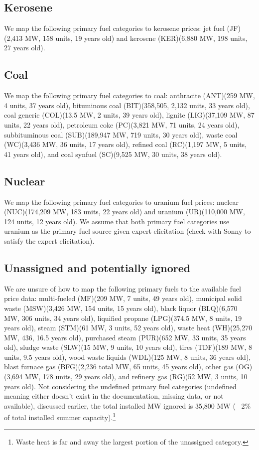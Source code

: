 \documentclass[10pt]{report}
\begin{document}
\subsection{Kerosene}
We map the following primary fuel categories to kerosene prices: jet fuel (JF)(2,413 MW, 158 units, 19 years old) and kerosene (KER)(6,880 MW, 198 units, 27 years old). 

\subsection{Coal}
We map the following primary fuel categories to coal: anthracite (ANT)(259 MW, 4 units, 37 years old), bituminous coal (BIT)(358,505, 2,132 units, 33 years old), coal generic (COL)(13.5 MW, 2 units, 39 years old), lignite (LIG)(37,109 MW, 87 units, 22 years old), petroleum coke (PC)(3,821 MW, 71 units, 24 years old), subbituminous coal (SUB)(189,947 MW, 719 units, 30 years old), waste coal (WC)(3,436 MW, 36 units, 17 years old), refined coal (RC)(1,197 MW, 5 units, 41 years old), and coal synfuel (SC)(9,525 MW, 30 units, 38 years old). 

\subsection{Nuclear}
We map the following primary fuel categories to uranium fuel prices: nuclear (NUC)(174,209 MW, 183 units, 22 years old) and uranium (UR)(110,000 MW, 124 units, 12 years old). 
We assume that both primary fuel categories use uranium as the primary fuel source given expert elicitation (check with Sonny to satisfy the expert elicitation).

\subsection{Unassigned and potentially ignored}
We are unsure of how to map the following primary fuels to the available fuel price data: multi-fueled (MF)(209 MW, 7 units, 49 years old), municipal solid waste (MSW)(3,426 MW, 154 units, 15 years old), black liquor (BLQ)(6,570 MW, 306 units, 34 years old), liquified propane (LPG)(374.5 MW, 8 units, 19 years old), steam (STM)(61 MW, 3 units, 52 years old), waste heat (WH)(25,270 MW, 436, 16.5 years old), purchased steam (PUR)(652 MW, 33 units, 35 years old), sludge waste (SLW)(15 MW, 9 units, 10 years old), tires (TDF)(189 MW, 8 units, 9.5 years old), wood waste liquids (WDL)(125 MW, 8 units, 36 years old), blast furnace gas (BFG)(2,236 total MW, 65 units, 45 years old), other gas (OG)(3,694 MW, 178 units, 29 years old), and refinery gas (RG)(52 MW, 3 units, 10 years old). 
Not considering the undefined primary fuel categories (undefined meaning either doesn't exist in the documentation, missing data, or not available), discussed earlier, the total installed MW ignored is 35,800 MW (~ 2\% of total installed summer capacity).\footnote{Waste heat is far and away the largest portion of the unassigned category.} 
\end{document}
